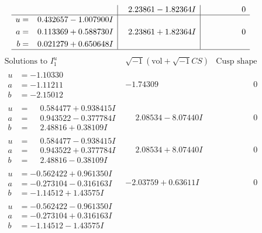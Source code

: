 \documentclass[1p]{elsarticle_modified}
\theoremstyle{definition}
\newcommand{\I}{\sqrt{-1}}
\begin{document}
$$\begin{array}{c|c|c}
 & \phantom{-}2.23861 - 1.82364 I & \phantom{-0.000000 } 0 \\ \hline\begin{aligned}
u &= \phantom{-}0.432657 - 1.007900 I \\
a &= \phantom{-}0.113369 + 0.588730 I \\
b &= \phantom{-}0.021279 + 0.650648 I\end{aligned}
 & \phantom{-}2.23861 + 1.82364 I & \phantom{-0.000000 } 0\\
 \hline 
 \end{array}$$\newpage$$\begin{array}{c|c|c}  
\text{Solutions to }I^u_{1}& \I (\text{vol} + \sqrt{-1}CS) & \text{Cusp shape}\\
 \hline 
\begin{aligned}
u &= -1.10330\phantom{ +0.000000I} \\
a &= -1.11211\phantom{ +0.000000I} \\
b &= -2.15012\phantom{ +0.000000I}\end{aligned}
 & -1.74309\phantom{ +0.000000I} & \phantom{-0.000000 } 0 \\ \hline\begin{aligned}
u &= \phantom{-}0.584477 + 0.938415 I \\
a &= \phantom{-}0.943522 - 0.377784 I \\
b &= \phantom{-}2.48816 + 0.38109 I\end{aligned}
 & \phantom{-}2.08534 - 8.07440 I & \phantom{-0.000000 } 0 \\ \hline\begin{aligned}
u &= \phantom{-}0.584477 - 0.938415 I \\
a &= \phantom{-}0.943522 + 0.377784 I \\
b &= \phantom{-}2.48816 - 0.38109 I\end{aligned}
 & \phantom{-}2.08534 + 8.07440 I & \phantom{-0.000000 } 0 \\ \hline\begin{aligned}
u &= -0.562422 + 0.961350 I \\
a &= -0.273104 - 0.316163 I \\
b &= -1.14512 + 1.43575 I\end{aligned}
 & -2.03759 + 0.63611 I & \phantom{-0.000000 } 0 \\ \hline\begin{aligned}
u &= -0.562422 - 0.961350 I \\
a &= -0.273104 + 0.316163 I \\
b &= -1.14512 - 1.43575 I\end{aligned}

\end{array}$$
\end{document}
